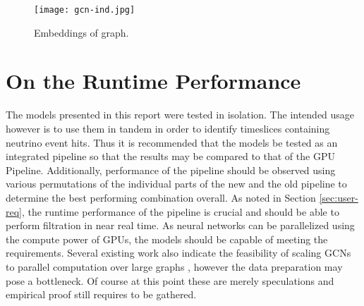 \begin{figure}[htb]
  \centering
  \texttt{[image: gcn-ind.jpg]}
  \caption{Embeddings of graph.}
  \label{fig:gcn-ind}
\end{figure}

\section{On the Runtime Performance}
The models presented in this report were tested in isolation. The
intended usage however is to use them in tandem in order to identify
timeslices containing neutrino event hits. Thus it is recommended that
the models be tested as an integrated pipeline so that the results may
be compared to that of the GPU Pipeline. Additionally, performance of
the pipeline should be observed using various permutations of the
individual parts of the new and the old pipeline to determine the best
performing combination overall. As noted in Section
\ref{sec:user-req}, the runtime performance of the pipeline is crucial
and should be able to perform filtration in near real time. As neural
networks can be parallelized using the compute power of GPUs, the
models should be capable of meeting the requirements. Several existing
work also indicate the feasibility of scaling GCNs to parallel
computation over large graphs \cite{ma2019high, ma2019neugraph,
  zeng2019accurate}, however the data preparation may pose a
bottleneck. Of course at this point these are merely speculations and
empirical proof still requires to be gathered.

